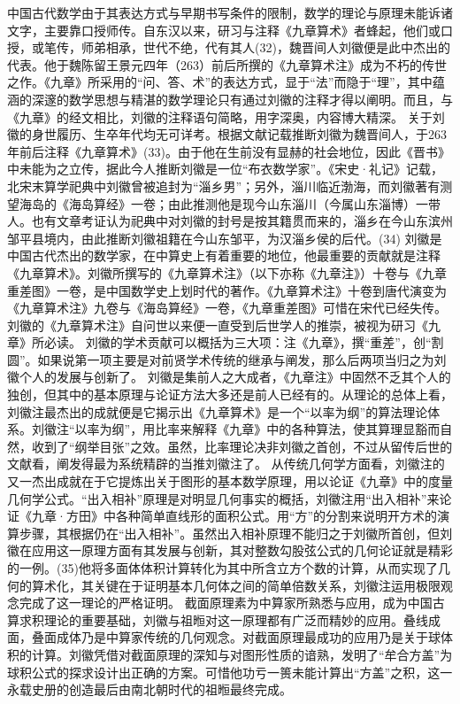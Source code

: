 \documentclass[12pt,UTF8]{ctexbook}
\begin{document}
中国古代数学由于其表达方式与早期书写条件的限制，数学的理论与原理未能诉诸文字，主要靠口授师传。自东汉以来，研习与注释《九章算术》者蜂起，他们或口授，或笔传，师弟相承，世代不绝，代有其人(32)，魏晋间人刘徽便是此中杰出的代表。他于魏陈留王景元四年（263）前后所撰的《九章算术注》成为不朽的传世之作。《九章》所采用的“问、答、术”的表达方式，显于“法”而隐于“理”，其中蕴涵的深邃的数学思想与精湛的数学理论只有通过刘徽的注释才得以阐明。而且，与《九章》的经文相比，刘徽的注释语句简略，用字深奥，内容博大精深。
关于刘徽的身世履历、生卒年代均无可详考。根据文献记载推断刘徽为魏晋间人，于263年前后注释《九章算术》(33)。由于他在生前没有显赫的社会地位，因此《晋书》中未能为之立传，据此今人推断刘徽是一位“布衣数学家”。《宋史·礼记》记载，北宋末算学祀典中刘徽曾被追封为“淄乡男”；另外，淄川临近渤海，而刘徽著有测望海岛的《海岛算经》一卷；由此推测他是现今山东淄川（今属山东淄博）一带人。也有文章考证认为祀典中对刘徽的封号是按其籍贯而来的，淄乡在今山东滨州邹平县境内，由此推断刘徽祖籍在今山东邹平，为汉淄乡侯的后代。(34)
刘徽是中国古代杰出的数学家，在中算史上有着重要的地位，他最重要的贡献就是注释《九章算术》。刘徽所撰写的《九章算术注》（以下亦称《九章注》）十卷与《九章重差图》一卷，是中国数学史上划时代的著作。《九章算术注》十卷到唐代演变为《九章算术注》九卷与《海岛算经》一卷，《九章重差图》可惜在宋代已经失传。刘徽的《九章算术注》自问世以来便一直受到后世学人的推崇，被视为研习《九章》所必读。
刘徽的学术贡献可以概括为三大项：注《九章》，撰“重差”，创“割圆”。如果说第一项主要是对前贤学术传统的继承与阐发，那么后两项当归之为刘徽个人的发展与创新了。
刘徽是集前人之大成者，《九章注》中固然不乏其个人的独创，但其中的基本原理与论证方法大多还是前人已经有的。从理论的总体上看，刘徽注最杰出的成就便是它揭示出《九章算术》是一个“以率为纲”的算法理论体系。刘徽注“以率为纲”，用比率来解释《九章》中的各种算法，使其算理显豁而自然，收到了“纲举目张”之效。虽然，比率理论决非刘徽之首创，不过从留传后世的文献看，阐发得最为系统精辟的当推刘徽注了。
从传统几何学方面看，刘徽注的又一杰出成就在于它提炼出关于图形的基本数学原理，用以论证《九章》中的度量几何学公式。“出入相补”原理是对明显几何事实的概括，刘徽注用“出入相补”来论证《九章·方田》中各种简单直线形的面积公式。用“方”的分割来说明开方术的演算步骤，其根据仍在“出入相补”。虽然出入相补原理不能归之于刘徽所首创，但刘徽在应用这一原理方面有其发展与创新，其对整数勾股弦公式的几何论证就是精彩的一例。(35)他将多面体体积计算转化为其中所含立方个数的计算，从而实现了几何的算术化，其关键在于证明基本几何体之间的简单倍数关系，刘徽注运用极限观念完成了这一理论的严格证明。
截面原理素为中算家所熟悉与应用，成为中国古算求积理论的重要基础，刘徽与祖暅对这一原理都有广泛而精妙的应用。叠线成面，叠面成体乃是中算家传统的几何观念。对截面原理最成功的应用乃是关于球体积的计算。刘徽凭借对截面原理的深知与对图形性质的谙熟，发明了“牟合方盖”为球积公式的探求设计出正确的方案。可惜他功亏一篑未能计算出“方盖”之积，这一永载史册的创造最后由南北朝时代的祖暅最终完成。
\end{document}
